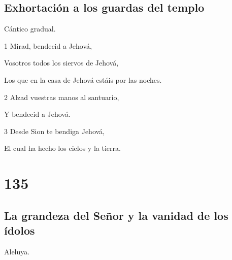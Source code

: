 \section*{Exhortación a los guardas del templo}

\par Cántico gradual.

\par 1 Mirad, bendecid a Jehová,
\par Vosotros todos los siervos de Jehová,
\par Los que en la casa de Jehová estáis por las noches.
\par 2 Alzad vuestras manos al santuario,
\par Y bendecid a Jehová.
\par 3 Desde Sion te bendiga Jehová,
\par El cual ha hecho los cielos y la tierra.

\chapter{135}

\section*{La grandeza del Señor y la vanidad de los ídolos}

\par Aleluya.

